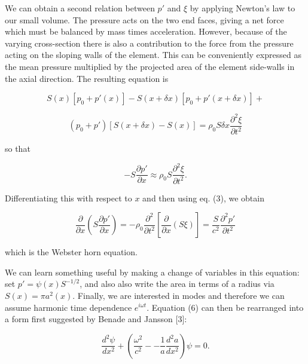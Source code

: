   We can obtain a second relation between $p'$ and $\xi$ by applying Newton's 
  law to our small volume. The pressure acts on the two end faces, giving a net 
  force which must be balanced by mass times acceleration. However, because of 
  the varying cross-section there is also a contribution to the force from the 
  pressure acting on the sloping walls of the element. This can be conveniently 
  expressed as the mean pressure multiplied by the projected area of the 
  element side-walls in the axial direction. The resulting equation is 

  \begin{equation*}S(x) [p_0+p'(x)] -S(x+ \delta x) [p_0+p'(x+ \delta x)] + 
  \end{equation*} 

  \begin{equation*}(p_0 +p') [S(x+ \delta x) -S(x)]= \rho_0 S \delta x 
  \frac{\partial^2 \xi}{\partial t^2} \tag{4}\end{equation*} 

  \noindent{}so that 

  \begin{equation*}- S\frac{\partial p'}{\partial x} \approx \rho_0 S 
  \frac{\partial^2 \xi}{\partial t^2} .\tag{5}\end{equation*} 

  Differentiating this with respect to $x$ and then using eq. (3), we obtain 

  \begin{equation*}\dfrac{\partial}{\partial x} \left( S\frac{\partial 
  p'}{\partial x} \right) = -\rho_0 \frac{\partial^2}{\partial t^2} \left[ 
  \frac{\partial }{\partial x} (S \xi) \right]= \dfrac{S}{c^2} \frac{\partial^2 
  p'}{\partial t^2} \tag{6}\end{equation*} 

  \noindent{}which is the Webster horn equation. 

  We can learn something useful by making a change of variables in this 
  equation: set $p'=\psi(x) S^{-1/2}$, and also also write the area in terms of 
  a radius via $S(x)=\pi a^2(x)$. Finally, we are interested in modes and 
  therefore we can assume harmonic time dependence $e^{i \omega t}$. Equation 
  (6) can then be rearranged into a form first suggested by Benade and Jansson 
  [3]: 

  \begin{equation*}\dfrac{d^2 \psi}{dx^2} + \left( \frac{\omega^2}{c^2} -- 
  \frac{1}{a} \dfrac{d^2a}{dx^2} \right) \psi = 0. \tag{7}\end{equation*} 

